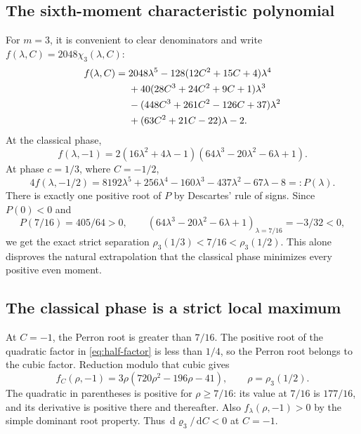 \documentclass[11pt,a4paper]{article}
\numberwithin{equation}{section}
\theoremstyle{definition}
\theoremstyle{remark}
\newcommand{\dd}{\,\mathrm d}
\begin{document}
\subsection{The sixth-moment characteristic polynomial}
For $m=3$, it is convenient to clear denominators and write
$f(\lambda,C)=2048\chi_3(\lambda,C)$:
\begin{align}
 f(\lambda,C)={}&2048\lambda^5
 -128(12C^2+15C+4)\lambda^4 \notag\\
 &+40(28C^3+24C^2+9C+1)\lambda^3 \notag\\
 &-(448C^3+261C^2-126C+37)\lambda^2 \notag\\
 &+(63C^2+21C-22)\lambda-2.
 \label{eq:f}
\end{align}
At the classical phase,
\begin{equation}
 f(\lambda,-1)=2(16\lambda^2+4\lambda-1)
 (64\lambda^3-20\lambda^2-6\lambda+1).
 \label{eq:half-factor}
\end{equation}
At phase $c=1/3$, where $C=-1/2$,
\begin{equation}
 4f(\lambda,-1/2)
 =8192\lambda^5+256\lambda^4-160\lambda^3
 -437\lambda^2-67\lambda-8=:P(\lambda).
 \label{eq:third-poly}
\end{equation}
There is exactly one positive root of $P$ by Descartes' rule of signs.
Since $P(0)<0$ and
\begin{equation}
 P(7/16)=405/64>0,
 \qquad
 (64\lambda^3-20\lambda^2-6\lambda+1)_{\lambda=7/16}
 =-3/32<0,
 \label{eq:separator}
\end{equation}
we get the exact strict separation
$\rho_3(1/3)<7/16<\rho_3(1/2)$.
This alone disproves the natural extrapolation that the classical phase
minimizes every positive even moment.

\subsection{The classical phase is a strict local maximum}
At $C=-1$, the Perron root is greater than $7/16$. The positive root
of the quadratic factor in \cref{eq:half-factor} is less than $1/4$,
so the Perron root belongs to the cubic factor. Reduction modulo that
cubic gives
\begin{equation}
 f_C(\rho,-1)=3\rho(720\rho^2-196\rho-41),
 \qquad \rho=\rho_3(1/2).
 \label{eq:fc-half}
\end{equation}
The quadratic in parentheses is positive for $\rho\geq7/16$:
its value at $7/16$ is $177/16$, and its derivative is positive there
and thereafter. Also $f_\lambda(\rho,-1)>0$ by the simple dominant
root property. Thus $\dd\varrho_3/\dd C<0$ at $C=-1$.
\end{document}
